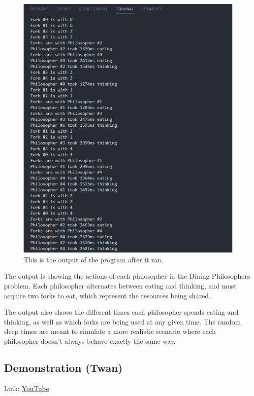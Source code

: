 \documentclass{article}
\begin{document}
\begin{figure}[!h]
\centering
\includegraphics[scale = 0.4]{fig1.png}
\caption{\label{fig:output}This is the output of the program after it ran.}
\end{figure}

The output is showing the actions of each philosopher in the Dining Philosophers problem. Each philosopher alternates between eating and thinking, and must acquire two forks to eat, which represent the resources being shared.

The output also shows the different times each philosopher spends eating and thinking, as well as which forks are being used at any given time. The random sleep times are meant to simulate a more realistic scenario where each philosopher doesn't always behave exactly the same way.

\subsection{Demonstration (Twan)}

Link: \href{https://www.youtube.com/}{YouTube}
\end{document}
